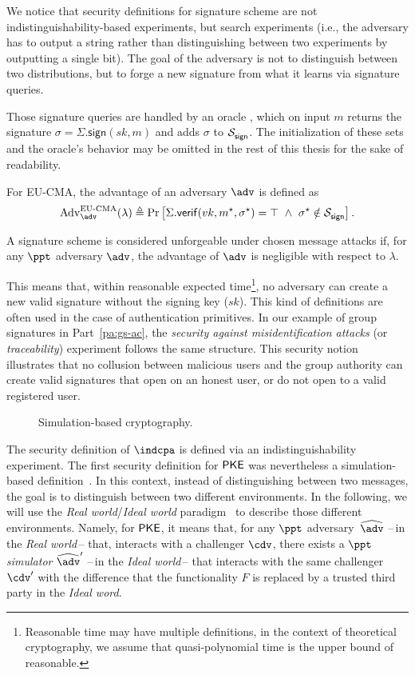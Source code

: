 We notice that security definitions for signature scheme are not indistinguishability-based experiments, but search experiments (i.e., the adversary has to output a string rather than distinguishing between two experiments by outputting a single bit).
The goal of the adversary is not to distinguish between two distributions, but to forge a new signature from what it learns via signature queries.

Those signature queries are handled by an oracle , which on input $m$ returns the signature $\sigma = \Sigma.\mathsf{sign}(sk, m)$ and adds $\sigma$ to $\mathcal S_{\mathsf{sign}}^{}$. The initialization of these sets and the oracle's behavior may be omitted in the rest of this thesis for the sake of readability.

For EU-CMA, the advantage of an adversary $\adv$ is defined as
\[
  \advantage{\textrm{EU-CMA}}{\adv}(\lambda)
  \triangleq
  \Pr\left[ \Sigma.\mathsf{verif}(vk, m^\star, \sigma^\star) = \top~\land~ \sigma^\star \notin \ensemble{sign} \right].
\]

A signature scheme is considered unforgeable under chosen message attacks if, for any $\ppt$ adversary $\adv$, the advantage of $\adv$ is negligible with respect to $\lambda$.

This means that, within reasonable expected time\footnote{Reasonable time may have multiple definitions, in the context of theoretical cryptography, we assume that quasi-polynomial time is the upper bound of reasonable.}, no adversary can create a new valid signature without the signing key ($sk$). This kind of definitions are often used in the case of authentication primitives.
In our example of group signatures in Part~\ref{pa:gs-ac}, the \emph{security against misidentification attacks} (or \emph{traceability}) experiment follows the same structure.
This security notion illustrates that
no collusion between malicious users and the group authority can create valid signatures
that open on an honest user, or do not open to a valid registered user.

\begin{figure}
  \centering
  
  \caption{Simulation-based cryptography.} \label{fig:sim-crypto}
\end{figure}

The security definition of $\indcpa$ is defined via an indistinguishability experiment.
The first security definition for $\textsf{PKE}$ was nevertheless a simulation-based definition~\cite{GM82}.
In this context, instead of distinguishing between two messages, the goal is to distinguish between two different environments.
In the following, we will use the \emph{Real world}/\emph{Ideal world} paradigm~\cite{Can01} to describe those different environments.
Namely, for $\textsf{PKE}$, it means that, for any $\ppt$ adversary~$\widehat{\adv}$ --\,in the \emph{Real world}\,-- that, interacts with a challenger $\cdv$,
there exists a $\ppt$ \emph{simulator} $\widehat{\adv}'$ --\,in the \emph{Ideal world}\,-- that interacts with the same challenger $\cdv'$ with the difference that the functionality $F$ is replaced by a trusted third party in the \emph{Ideal word}.

